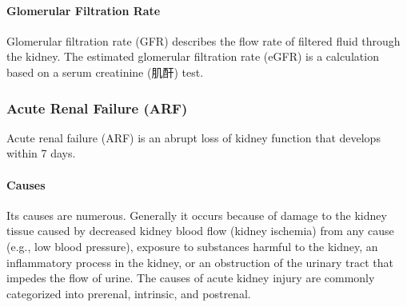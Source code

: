 \documentclass{article}
\begin{document}
\paragraph{Glomerular Filtration Rate} Glomerular filtration rate (GFR) describes the flow rate of filtered fluid through the kidney. The estimated glomerular filtration rate (eGFR) is a calculation based on a serum creatinine (肌酐) test. 


\subsubsection{Acute Renal Failure (ARF)}
Acute renal failure (ARF) is an abrupt loss of kidney function that develops within 7 days. 

\paragraph{Causes} Its causes are numerous. Generally it occurs because of damage to the kidney tissue caused by decreased kidney blood flow (kidney ischemia) from any cause (e.g., low blood pressure), exposure to substances harmful to the kidney, an inflammatory process in the kidney, or an obstruction of the urinary tract that impedes the flow of urine. The causes of acute kidney injury are commonly categorized into prerenal, intrinsic, and postrenal.
\end{document}
